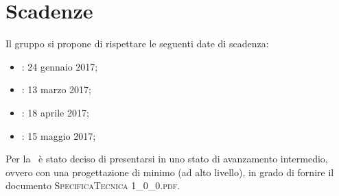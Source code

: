 \newpage
\section{Scadenze}
Il gruppo \textit{\gruppo} si propone di rispettare le seguenti date di scadenza:
\begin{itemize}
	\item \textbf{\RR}: 24 gennaio 2017;
	\item \textbf{\RP}: 13 marzo 2017;
	\item \textbf{\RQ}: 18 aprile 2017;
	\item \textbf{\RA}: 15 maggio 2017;
\end{itemize}
Per la \RP\ è stato deciso di presentarsi in uno stato di avanzamento intermedio, ovvero con una progettazione di minimo (ad alto livello), in grado di fornire il documento \textsc{SpecificaTecnica 1\_0\_0.pdf}.
